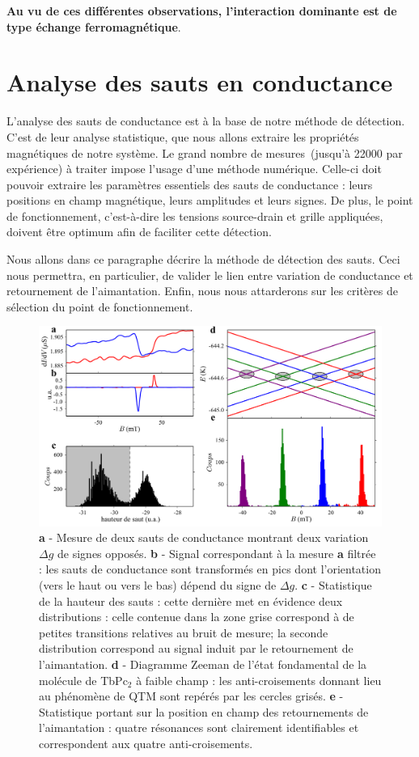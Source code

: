 \textbf{Au vu de ces différentes observations, l'interaction dominante est de type échange ferromagnétique}.

\section{Analyse des sauts en conductance}
L'analyse des sauts de conductance est à la base de notre méthode de détection. C'est de leur analyse statistique, que nous allons extraire les propriétés magnétiques de notre système. Le grand nombre de mesures~(jusqu'à 22000 par expérience) à traiter impose l'usage d'une méthode numérique. Celle-ci doit pouvoir extraire les paramètres essentiels des sauts de conductance : leurs positions en champ magnétique, leurs amplitudes et leurs signes. De plus, le point de fonctionnement, c'est-à-dire les tensions source-drain et grille appliquées, doivent être optimum afin de faciliter cette détection. 

Nous allons dans ce paragraphe décrire la méthode de détection des sauts. Ceci nous permettra, en particulier, de valider le lien entre variation de conductance et retournement de l'aimantation. Enfin, nous nous attarderons sur les critères de sélection du point de fonctionnement.

\begin{figure}
\includegraphics[scale=0.45]{Resultats/CondJump/CondJump.pdf} 
\caption{\textbf{a} - Mesure de deux sauts de conductance montrant deux variation $\Delta g$ de signes opposés. \textbf{b} - Signal correspondant à la mesure \textbf{a} filtrée : les sauts de conductance sont transformés en pics dont l'orientation (vers le haut ou vers le bas) dépend du signe de $\Delta g$. \textbf{c} - Statistique de la hauteur des sauts : cette dernière met en évidence deux distributions : celle contenue dans la zone grise correspond à de petites transitions relatives au bruit de mesure; la seconde distribution correspond au signal induit par le retournement de l'aimantation. \textbf{d} - Diagramme Zeeman de l'état fondamental de la molécule de TbPc$_2$ à faible champ : les anti-croisements donnant lieu au phénomène de QTM sont repérés par les cercles grisés. \textbf{e} - Statistique portant sur la position en champ des retournements de l'aimantation : quatre résonances sont clairement identifiables et correspondent aux quatre anti-croisements.}
\label{analyse_saut}
\end{figure}


